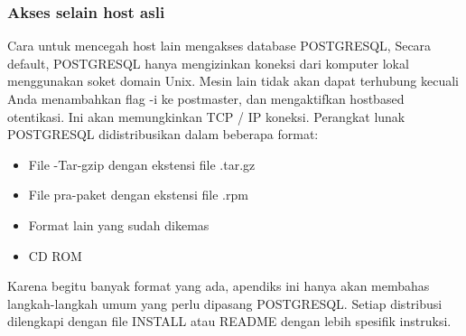 \subsubsection{Akses selain host asli}
Cara untuk mencegah host lain mengakses database POSTGRESQL, Secara default, POSTGRESQL hanya mengizinkan koneksi dari komputer lokal menggunakan soket domain Unix. Mesin lain tidak akan dapat terhubung kecuali Anda menambahkan flag -i ke postmaster, dan mengaktifkan hostbased otentikasi. Ini akan memungkinkan TCP / IP koneksi. Perangkat lunak POSTGRESQL didistribusikan dalam beberapa format:
\begin {itemize}
	\item File -Tar-gzip dengan ekstensi file .tar.gz
	\item File pra-paket dengan ekstensi file .rpm
	\item Format lain yang sudah dikemas
	\item CD ROM
\end {itemize}
Karena begitu banyak format yang ada, apendiks ini hanya akan membahas langkah-langkah umum yang perlu dipasang POSTGRESQL. Setiap distribusi dilengkapi dengan file INSTALL atau README dengan lebih spesifik instruksi.

